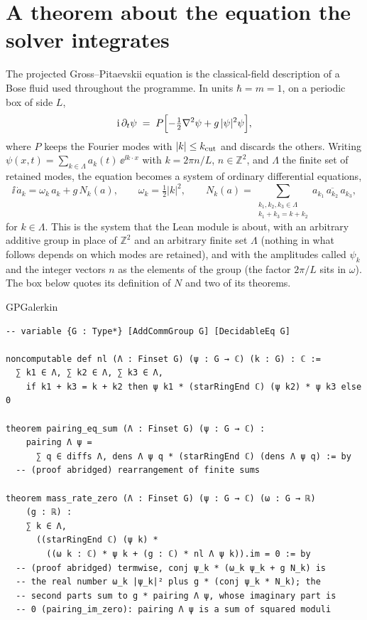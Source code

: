 \section{A theorem about the equation the solver integrates}\label{ch02:theorem}

The projected Gross--Pitaevskii equation \cite{Davis2001,Blakie2008} is the classical-field description of a Bose fluid used throughout the programme. In units $\hbar=m=1$, on a
periodic box of side $L$,
\begin{equation}\label{ch02:eq-pgpe}
 \mathrm{i}\,\partial_t\psi \;=\; P\Bigl[-\tfrac12\nabla^2\psi+g\,|\psi|^2\psi\Bigr],
\end{equation}
where $P$ keeps the Fourier modes with $|k|\le k_{\rm cut}$ and discards the others. Writing $\psi(x,t)=\sum_{k\in\Lambda}a_k(t)\,\ee^{\ii k\cdot x}$ with $k=2\pi n/L$, $n\in\mathbb Z^2$, and
$\Lambda$ the finite set of retained modes, the equation becomes a system of ordinary differential equations,
\begin{equation}\label{ch02:eq-modes}
 \ii\,\dot a_k=\omega_k\,a_k+g\,N_k(a),\qquad \omega_k=\tfrac12|k|^2,\qquad
 N_k(a)=\sum_{\substack{k_1,k_2,k_3\in\Lambda\\ k_1+k_3=k+k_2}}a_{k_1}\,\overline{a_{k_2}}\,a_{k_3},
\end{equation}
for $k\in\Lambda$. This is the system that the Lean module  is about, with an arbitrary additive group in place of $\mathbb Z^2$ and an arbitrary finite
set $\Lambda$ (nothing in what follows depends on which modes are retained), and with the amplitudes called $\psi_k$ and the integer vectors $n$ as the elements of the group (the factor $2\pi/L$ sits in $\omega$). The box below quotes its definition of $N$ and two of its theorems.

\begin{leanbox}{GPGalerkin}
\begin{lstlisting}[style=lean]
-- variable {G : Type*} [AddCommGroup G] [DecidableEq G]

noncomputable def nl (Λ : Finset G) (ψ : G → ℂ) (k : G) : ℂ :=
  ∑ k1 ∈ Λ, ∑ k2 ∈ Λ, ∑ k3 ∈ Λ,
    if k1 + k3 = k + k2 then ψ k1 * (starRingEnd ℂ) (ψ k2) * ψ k3 else 0

theorem pairing_eq_sum (Λ : Finset G) (ψ : G → ℂ) :
    pairing Λ ψ =
      ∑ q ∈ diffs Λ, dens Λ ψ q * (starRingEnd ℂ) (dens Λ ψ q) := by
  -- (proof abridged) rearrangement of finite sums

theorem mass_rate_zero (Λ : Finset G) (ψ : G → ℂ) (ω : G → ℝ)
    (g : ℝ) :
    ∑ k ∈ Λ,
      ((starRingEnd ℂ) (ψ k) *
        ((ω k : ℂ) * ψ k + (g : ℂ) * nl Λ ψ k)).im = 0 := by
  -- (proof abridged) termwise, conj ψ_k * (ω_k ψ_k + g N_k) is
  -- the real number ω_k |ψ_k|² plus g * (conj ψ_k * N_k); the
  -- second parts sum to g * pairing Λ ψ, whose imaginary part is
  -- 0 (pairing_im_zero): pairing Λ ψ is a sum of squared moduli
\end{lstlisting}
\end{leanbox}


